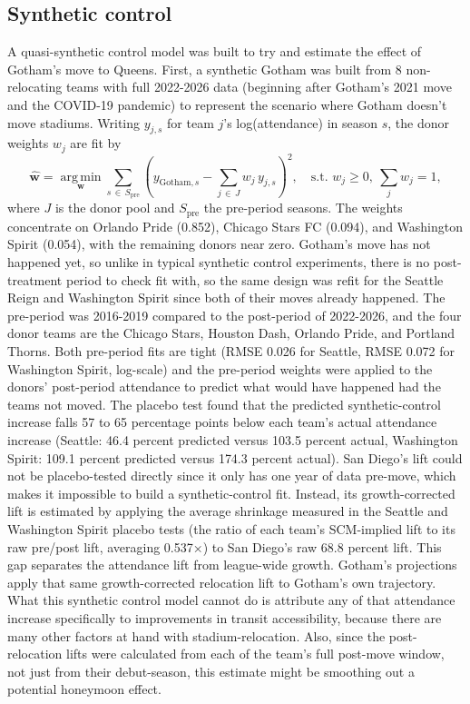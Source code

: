\documentclass[9pt,twoside]{pnas-new}
\begin{document}
\subsection{Synthetic control}
A quasi-synthetic control model was built to try and estimate the effect of Gotham's move to Queens. First, a synthetic Gotham was built from 8 non-relocating teams with full 2022-2026 data (beginning after Gotham's 2021 move and the COVID-19 pandemic) to represent the scenario where Gotham doesn't move stadiums.  Writing $y_{j,s}$ for team $j$'s log(attendance) in season $s$, the donor weights $w_j$ are fit by
\begin{equation}
\hat{\mathbf{w}} = \operatorname*{arg\,min}_{\mathbf{w}} \sum_{s \, \in \, S_{\text{pre}}} \left( y_{\text{Gotham},s} - \sum_{j \, \in \, J} w_j \, y_{j,s} \right)^2, \quad \text{s.t. } w_j \ge 0,\ \sum_{j} w_j = 1,
\label{eq:scm}
\end{equation}
where $J$ is the donor pool and $S_{\text{pre}}$ the pre-period seasons. The weights concentrate on Orlando Pride (0.852), Chicago Stars FC (0.094), and Washington Spirit (0.054), with the remaining donors near zero. Gotham's move has not happened yet, so unlike in typical synthetic control experiments, there is no post-treatment period to check fit with, so the same design was refit for the Seattle Reign and Washington Spirit since both of their moves already happened. The pre-period was 2016-2019 compared to the post-period of 2022-2026, and the four donor teams are the Chicago Stars, Houston Dash, Orlando Pride, and Portland Thorns. Both pre-period fits are tight (RMSE 0.026 for Seattle, RMSE 0.072 for Washington Spirit, log-scale) and the pre-period weights were applied to the donors' post-period attendance to predict what would have happened had the teams not moved. The placebo test found that the predicted synthetic-control increase falls 57 to 65 percentage points below each team's actual attendance increase (Seattle: 46.4 percent predicted versus 103.5 percent actual, Washington Spirit: 109.1 percent predicted versus 174.3 percent actual). San Diego's lift could not be placebo-tested directly since it only has one year of data pre-move, which makes it impossible to build a synthetic-control fit. Instead, its growth-corrected lift is estimated by applying the average shrinkage measured in the Seattle and Washington Spirit placebo tests (the ratio of each team's SCM-implied lift to its raw pre/post lift, averaging 0.537×) to San Diego's raw 68.8 percent lift. This gap separates the attendance lift from league-wide growth. Gotham's projections apply that same growth-corrected relocation lift to Gotham's own trajectory. What this synthetic control model cannot do is attribute any of that attendance increase specifically to improvements in transit accessibility, because there are many other factors at hand with stadium-relocation. Also, since the post-relocation lifts were calculated from each of the team's full post-move window, not just from their debut-season, this estimate might be smoothing out a potential honeymoon effect. 
\end{document}
